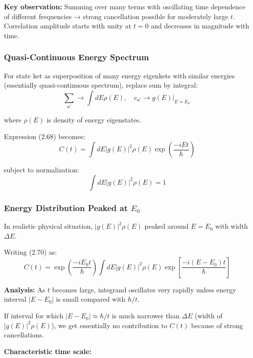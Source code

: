 \documentclass[11pt,a4paper]{article}
\begin{document}
\textbf{Key observation:} Summing over many terms with oscillating time dependence of different frequencies → strong cancellation possible for moderately large $t$. Correlation amplitude starts with unity at $t = 0$ and decreases in magnitude with time.

\subsubsection{Quasi-Continuous Energy Spectrum}

For state ket as superposition of many energy eigenkets with similar energies (essentially quasi-continuous spectrum), replace sum by integral:
\begin{equation}
\sum_{a'} \to \int dE\rho(E), \quad c_{a'} \to g(E)\Big|_{E \simeq E_{a'}}
\tag{2.69}
\end{equation}

where $\rho(E)$ is density of energy eigenstates.

Expression (2.68) becomes:
\begin{equation}
C(t) = \int dE|g(E)|^2\rho(E)\exp\left(\frac{-iEt}{\hbar}\right)
\tag{2.70}
\end{equation}

subject to normalization:
\begin{equation}
\int dE|g(E)|^2\rho(E) = 1
\tag{2.71}
\end{equation}

\subsubsection{Energy Distribution Peaked at $E_0$}

In realistic physical situation, $|g(E)|^2\rho(E)$ peaked around $E = E_0$ with width $\Delta E$.

Writing (2.70) as:
\begin{equation}
C(t) = \exp\left(\frac{-iE_0 t}{\hbar}\right)\int dE|g(E)|^2\rho(E)\exp\left[\frac{-i(E - E_0)t}{\hbar}\right]
\tag{2.72}
\end{equation}

\textbf{Analysis:} As $t$ becomes large, integrand oscillates very rapidly unless energy interval $|E - E_0|$ is small compared with $\hbar/t$. 

If interval for which $|E - E_0| \simeq \hbar/t$ is much narrower than $\Delta E$ (width of $|g(E)|^2\rho(E)$), we get essentially no contribution to $C(t)$ because of strong cancellations.

\textbf{Characteristic time scale:}
\end{document}
